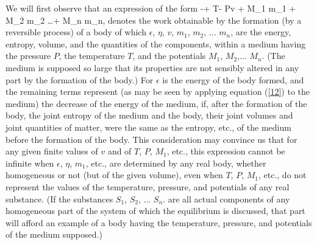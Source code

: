 \documentclass[12pt]{article}
\begin{document}
We will first observe that an expression of the form
\eqs-\epsilon + T\eta - Pv + M_1 m_1 + M_2 m_2 \dots + M_n m_n,    \label{54}\eqe
denotes the work obtainable by the formation (by a reversible process) of a body of which $\epsilon$, $\eta$, $v$, $m_1$, $m_2$, ... $m_n$, are the energy, entropy, volume, and the quantities of the components, within a medium having the pressure $P$, the temperature $T$, and the potentials $M_1$, $M_2$,... $M_n$. (The medium is supposed so large that its properties are not sensibly altered in any part by the formation of the body.) For $\epsilon$ is the energy of the body formed, and the remaining terms represent (as may be seen by applying equation (\ref{12}) to the medium) the decrease of the energy of the medium, if, after the formation of the body, the joint entropy of the medium and the body, their joint volumes and joint quantities of matter, were the same as the entropy, etc., of the medium before the formation of the body. This consideration may convince us that for any given finite values of $v$ and of $T$, $P$, $M_1$, etc., this expression cannot be infinite when $\epsilon$, $\eta$, $m_1$, etc., are determined by any real body, whether homogeneous or not (but of the given volume), even when $T$, $P$, $M_1$, etc., do not represent the values of the temperature, pressure, and potentials of any real substance. (If the substances $S_1$, $S_2$, ... $S_n$. are all actual components of any homogeneous part of the system of which the equilibrium is discussed, that part will afford an example of a body having the temperature, pressure, and potentials of the medium supposed.)
\end{document}
